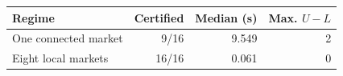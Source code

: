 \begin{tabular}{@{}lrrr@{}}
\toprule
Regime & Certified & Median (s) & Max. $U-L$\\
\midrule
One connected market & 9/16 & 9.549 & 2\\
Eight local markets & 16/16 & 0.061 & 0\\
\bottomrule
\end{tabular}
